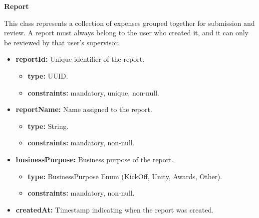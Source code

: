 \textbf{Report}

This class represents a collection of expenses grouped together for submission and review. A report must always belong to the user who created it, and it can only be reviewed by that user's supervisor.

\begin{itemize} [leftmargin=0.75cm, noitemsep, label=\textbullet]

    \item \textbf{reportId:} Unique identifier of the report.
    
    \begin{itemize} [leftmargin=0.75cm, noitemsep, label=$\circ$]

        \item \textbf{type:} UUID.

        \item \textbf{constraints:} mandatory, unique, non-null.

    \end{itemize}

    \item \textbf{reportName:} Name assigned to the report.
    
    \begin{itemize} [leftmargin=0.75cm, noitemsep, label=$\circ$]

        \item \textbf{type:} String.

        \item \textbf{constraints:} mandatory, non-null.

    \end{itemize}

    \item \textbf{businessPurpose:} Business purpose of the report.
    
    \begin{itemize} [leftmargin=0.75cm, noitemsep, label=$\circ$]

        \item \textbf{type:} BusinessPurpose Enum (KickOff, Unity, Awards, Other).

        \item \textbf{constraints:} mandatory, non-null.

    \end{itemize}

    \newpage

    \item \textbf{createdAt:} Timestamp indicating when the report was created.
    

\end{itemize}
